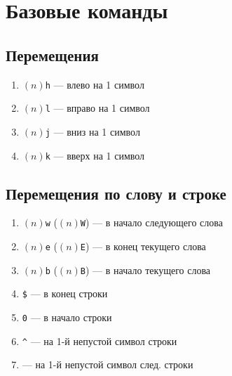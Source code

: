 \documentclass[a4paper,10pt, twocolumn]{article}
\newcommand*{\cod}[1]{\texttt{#1}}
\begin{document}
\section{Базовые команды}

\subsection{Перемещения}
\begin{enumerate}
    \item $(n)$\cod{h} --- влево на 1 символ
    \item $(n)$\cod{l} --- вправо на 1 символ
    \item $(n)$\cod{j} --- вниз на 1 символ
    \item $(n)$\cod{k} --- вверх на 1 символ
\end{enumerate}

\subsection{Перемещения по слову и строке}
\begin{enumerate}
    \item $(n)$\cod{w} ($(n)$\cod{W}) --- в начало следующего слова
    \item $(n)$\cod{e} ($(n)$\cod{E}) --- в конец текущего слова
    \item $(n)$\cod{b} ($(n)$\cod{B}) --- в начало текущего слова
    \item \cod{\$} --- в конец строки
    \item \cod{0} --- в начало строки
    \item \cod{\^} --- на 1-й непустой символ строки
    \item \Enter --- на 1-й непустой символ след. строки
\end{enumerate}
\end{document}

